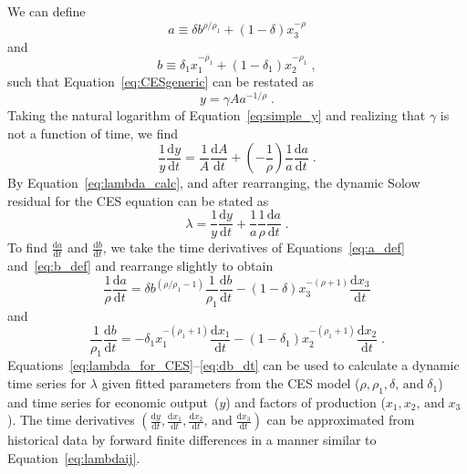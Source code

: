 \documentclass[preprint,authoryear,12pt]{elsarticle}\usepackage[]{graphicx}\usepackage[]{color}
\begin{document}
We can define
%
\begin{equation} \label{eq:a_def}
  a \equiv \delta b^{\rho/\rho_1} + (1-\delta) x_3^{-\rho}
\end{equation}
%
and
%
\begin{equation} \label{eq:b_def}
  b \equiv \delta_1 x_1^{-\rho_1} + (1 - \delta_1) x_2^{-\rho_1} \; ,
\end{equation}
%
such that Equation~\ref{eq:CESgeneric} can be restated as
%
\begin{equation} \label{eq:simple_y} 
  y = \gamma A a^{-1/\rho} \; .
\end{equation}
%
Taking the natural logarithm of Equation~\ref{eq:simple_y}
and realizing that $\gamma$ is not a function of time, we find
%
\begin{equation}
  \frac{1}{y} \frac{\mathrm{d} y}{\mathrm{d} t} = \frac{1}{A} \frac{\mathrm{d} A}{\mathrm{d} t} 
                      + \left( - \frac{1}{\rho} \right) \frac{1}{a} \frac{\mathrm{d} a}{\mathrm{d} t} \; .
\end{equation}
%
By Equation~\ref{eq:lambda_calc}, and after rearranging, 
the dynamic Solow residual for the CES equation can be stated as
%
\begin{equation} \label{eq:lambda_for_CES}
  \lambda = \frac{1}{y} \frac{\mathrm{d} y}{\mathrm{d} t} + \frac{1}{a} \frac{1}{\rho} \frac{\mathrm{d} a}{\mathrm{d} t} \; .
\end{equation}
%
To find $\frac{\mathrm{d} a}{\mathrm{d} t}$ and $\frac{\mathrm{d} b}{\mathrm{d} t}$, 
we take the time derivatives 
of Equations~\ref{eq:a_def} and~\ref{eq:b_def}
and rearrange slightly to obtain
%
\begin{equation} \label{eq:da_dt}
  \frac{1}{\rho} \frac{\mathrm{d} a}{\mathrm{d} t} = \delta b^{(\rho/\rho_1 - 1)} \frac{1}{\rho_1} \frac{\mathrm{d} b}{\mathrm{d} t}
                                      - (1-\delta) x_3^{-(\rho + 1)} \frac{\mathrm{d} x_3}{\mathrm{d} t}
\end{equation}
%
and
%
\begin{equation} \label{eq:db_dt}
  \frac{1}{\rho_1} \frac{\mathrm{d} b}{\mathrm{d} t} = - \delta_1 x_1^{-(\rho_1 + 1)} \frac{\mathrm{d} x_1}{\mathrm{d} t}
                                      - (1 - \delta_1) x_2^{-(\rho_1 + 1)} \frac{\mathrm{d} x_2}{\mathrm{d} t} \; .
\end{equation}
%
Equations~\ref{eq:lambda_for_CES}--\ref{eq:db_dt} can be used to 
calculate a dynamic time series for $\lambda$ given 
fitted parameters from the CES model
($\rho, \rho_1, \delta, \, \mathrm{and} \; \delta_1$)
and time series for economic output~($y$) and
factors of production 
($x_1, x_2, \, \mathrm{and} \; x_3$).
The time derivatives $\left( 
\frac{\mathrm{d} y}{\mathrm{d} t}, 
\frac{\mathrm{d} x_1}{\mathrm{d} t},
\frac{\mathrm{d} x_2}{\mathrm{d} t}, \, \mathrm{and} \;
\frac{\mathrm{d} x_3}{\mathrm{d} t} \right)$
can be approximated from historical data
by forward finite differences in a manner similar to Equation~\ref{eq:lambdaij}.
\end{document}
